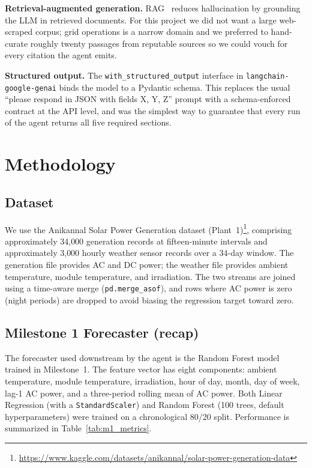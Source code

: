 \documentclass[journal,onecolumn,11pt]{IEEEtran}
\begin{document}
\textbf{Retrieval-augmented generation.} RAG~\citep{lewis2020rag} reduces hallucination by grounding the LLM in retrieved documents. For this project we did not want a large web-scraped corpus; grid operations is a narrow domain and we preferred to hand-curate roughly twenty passages from reputable sources so we could vouch for every citation the agent emits.

\textbf{Structured output.} The \texttt{with\_structured\_output} interface in \texttt{langchain-google-genai} binds the model to a Pydantic schema. This replaces the usual ``please respond in JSON with fields X, Y, Z'' prompt with a schema-enforced contract at the API level, and was the simplest way to guarantee that every run of the agent returns all five required sections.

\section{Methodology}

\subsection{Dataset}
We use the Anikannal Solar Power Generation dataset (Plant~1)\footnote{\url{https://www.kaggle.com/datasets/anikannal/solar-power-generation-data}}, comprising approximately 34{,}000 generation records at fifteen-minute intervals and approximately 3{,}000 hourly weather sensor records over a 34-day window. The generation file provides AC and DC power; the weather file provides ambient temperature, module temperature, and irradiation. The two streams are joined using a time-aware merge (\texttt{pd.merge\_asof}), and rows where AC power is zero (night periods) are dropped to avoid biasing the regression target toward zero.

\subsection{Milestone 1 Forecaster (recap)}
The forecaster used downstream by the agent is the Random Forest model trained in Milestone~1. The feature vector has eight components: ambient temperature, module temperature, irradiation, hour of day, month, day of week, lag-1 AC power, and a three-period rolling mean of AC power. Both Linear Regression (with a \texttt{StandardScaler}) and Random Forest (100 trees, default hyperparameters) were trained on a chronological 80/20 split. Performance is summarized in Table~\ref{tab:m1_metrics}.
\end{document}
